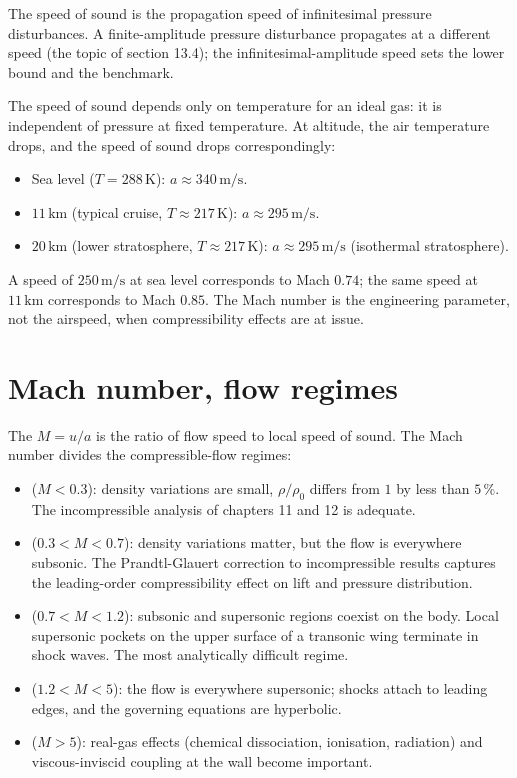 The speed of sound is the propagation speed of infinitesimal
pressure disturbances. A finite-amplitude pressure disturbance
propagates at a different speed (the topic of section 13.4); the
infinitesimal-amplitude speed sets the lower bound and the
benchmark.

The speed of sound depends only on temperature for an ideal gas:
it is independent of pressure at fixed temperature. At
altitude, the air temperature drops, and the speed of sound drops
correspondingly:

\begin{itemize}[leftmargin=*]
  \item Sea level ($T = 288\,\si{\kelvin}$): $a \approx 340\,\si{
    \meter\per\second}$.
  \item $11\,\si{\kilo\meter}$ (typical cruise, $T \approx 217\,\si{
    \kelvin}$): $a \approx 295\,\si{\meter\per\second}$.
  \item $20\,\si{\kilo\meter}$ (lower stratosphere, $T \approx 217\,
    \si{\kelvin}$): $a \approx 295\,\si{\meter\per\second}$
    (isothermal stratosphere).
\end{itemize}

A speed of $250\,\si{\meter\per\second}$ at sea level corresponds
to Mach $0.74$; the same speed at $11\,\si{\kilo\meter}$
corresponds to Mach $0.85$. The Mach number is the engineering
parameter, not the airspeed, when compressibility effects are at
issue.

\section{Mach number, flow regimes}

The  $M = u/a$ is the ratio of flow speed to
local speed of sound. The Mach number divides the compressible-flow
regimes:

\begin{itemize}[leftmargin=*]
  \item {} ($M < 0.3$): density variations
    are small, $\rho/\rho_0$ differs from $1$ by less than
    $5\,\%$. The incompressible analysis of chapters 11 and 12 is
    adequate.
  \item {} ($0.3 < M < 0.7$): density
    variations matter, but the flow is everywhere subsonic. The
    Prandtl-Glauert correction to incompressible results captures
    the leading-order compressibility effect on lift and
    pressure distribution.
  \item {} ($0.7 < M < 1.2$): subsonic and
    supersonic regions coexist on the body. Local supersonic
    pockets on the upper surface of a transonic wing terminate in
    shock waves. The most analytically difficult regime.
  \item {} ($1.2 < M < 5$): the flow is
    everywhere supersonic; shocks attach to leading edges, and
    the governing equations are hyperbolic.
  \item {} ($M > 5$): real-gas effects (chemical
    dissociation, ionisation, radiation) and viscous-inviscid
    coupling at the wall become important.
\end{itemize}

